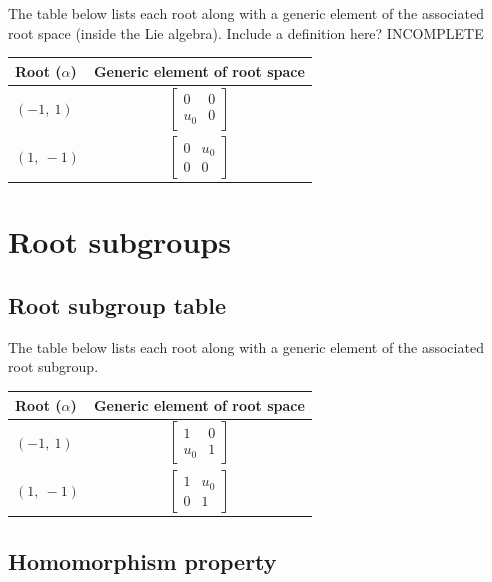 \documentclass[11pt]{article}
\newcommand{\noi}{\noindent}
\theoremstyle{definition}
\begin{document}
\noi The table below lists each root along with a generic element of the associated root space (inside the Lie algebra). Include a definition here? INCOMPLETE

\bigskip

\noindent \begin{tabular}{|l|c|}
    \hline
    \textbf{Root ($\alpha$)} & \textbf{Generic element of root space} \\
    \hline
    $\left( -1, \  1\right)$ & $\left[\begin{matrix}0 & 0\\u_{0} & 0\end{matrix}\right]$ \\
    \hline
    $\left( 1, \  -1\right)$ & $\left[\begin{matrix}0 & u_{0}\\0 & 0\end{matrix}\right]$ \\
    \hline
\end{tabular}


\newpage
\section{Root subgroups}

\subsection{Root subgroup table}

\noi The table below lists each root along with a generic element of the associated root subgroup.

\bigskip

\noindent \begin{tabular}{|l|c|}
    \hline
    \textbf{Root ($\alpha$)} & \textbf{Generic element of root space} \\
    \hline
    $\left( -1, \  1\right)$ & $\left[\begin{matrix}1 & 0\\u_{0} & 1\end{matrix}\right]$ \\
    \hline
    $\left( 1, \  -1\right)$ & $\left[\begin{matrix}1 & u_{0}\\0 & 1\end{matrix}\right]$ \\
    \hline
\end{tabular}


\subsection{Homomorphism property}
\end{document}
